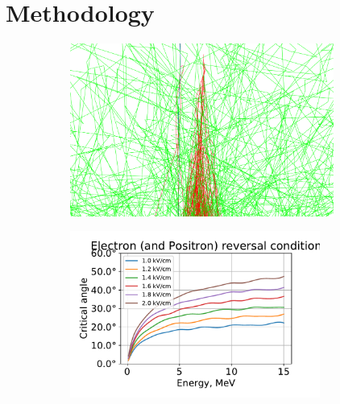 \documentclass{webofc}
\begin{document}
    \section{Methodology}
    \newsavebox{\leftpic}
    \begin{figure}[t]\centering
        \sbox{\leftpic}%
        {%
            \begin{subfigure}[b]{0.4\linewidth}\centering
                \includegraphics[width=0.95\textwidth]{pictures/10_dwyer}
                \caption{}\label{pic-dwyer-a}
            \end{subfigure}%
        }
        \usebox{\leftpic}
        \quad %
        \begin{minipage}[b][\ht\leftpic][s]{0.5\linewidth}
            \begin{center}
                \begin{subfigure}[b]{\textwidth}
                    \includegraphics[width=0.9\textwidth]{pictures/09_condition}
                    \caption{}
                    \label{pic-reverse-b}
                \end{subfigure}
                

\end{center}
\end{minipage}
\end{figure}
\end{document}
